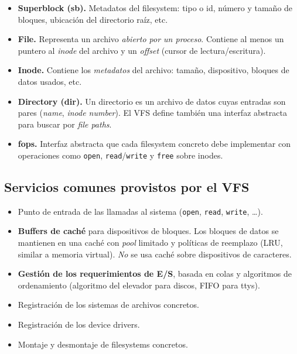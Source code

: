 \documentclass[11pt,a4paper]{article}
\begin{document}
\begin{itemize}[leftmargin=*]
    \item \textbf{Superblock (sb).} Metadatos del filesystem: tipo o
        id, número y tamaño de bloques, ubicación del directorio raíz,
        etc.
    \item \textbf{File.} Representa un archivo \emph{abierto por un
        proceso}. Contiene al menos un puntero al \emph{inode} del
        archivo y un \emph{offset} (cursor de lectura/escritura).
    \item \textbf{Inode.} Contiene los \emph{metadatos} del archivo:
        tamaño, dispositivo, bloques de datos usados, etc.
    \item \textbf{Directory (dir).} Un directorio es un archivo de
        datos cuyas entradas son pares (\emph{name}, \emph{inode
        number}). El VFS define también una interfaz abstracta para
        buscar por \emph{file paths}.
    \item \textbf{fops.} Interfaz abstracta que cada filesystem
        concreto debe implementar con operaciones como
        \texttt{open}, \texttt{read}/\texttt{write} y
        \texttt{free} sobre inodes.
\end{itemize}

\subsection{Servicios comunes provistos por el VFS}

\begin{itemize}[leftmargin=*]
    \item Punto de entrada de las llamadas al sistema (\texttt{open},
        \texttt{read}, \texttt{write}, \ldots).
    \item \textbf{Buffers de caché} para dispositivos de bloques. Los
        bloques de datos se mantienen en una caché con \emph{pool}
        limitado y políticas de reemplazo (LRU, similar a memoria
        virtual). \emph{No} se usa caché sobre dispositivos de
        caracteres.
    \item \textbf{Gestión de los requerimientos de E/S}, basada en
        colas y algoritmos de ordenamiento (algoritmo del elevador
        para discos, FIFO para ttys).
    \item Registración de los sistemas de archivos concretos.
    \item Registración de los device drivers.
    \item Montaje y desmontaje de filesystems concretos.
\end{itemize}
\end{document}
